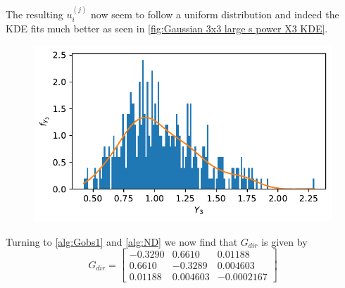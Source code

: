 \documentclass[../Thesis.tex]{subfiles}
\begin{document}
The resulting $u_i^{(j)}$ now seem to follow a uniform distribution and indeed the KDE fits much better as seen in \autoref{fig:Gaussian 3x3 large s power X3 KDE}.
\begin{figure}[H]
    \centering
    \includegraphics[width=0.7\linewidth]{figures/ND examples/Gaussian 3x3 large s power X3 KDE.pdf}
    \caption{}
    \label{fig:Gaussian 3x3 large s power X3 KDE}
\end{figure}
Turning to \autoref{alg:Gobs1} and \autoref{alg:ND} we now find that $G_{dir}$ is given by
$$G_{dir} =
    \begin{bmatrix}
        -0.3290 & 0.6610   & 0.01188    \\
        0.6610  & -0.3289  & 0.004603   \\
        0.01188 & 0.004603 & -0.0002167
    \end{bmatrix}
$$

\end{document}
